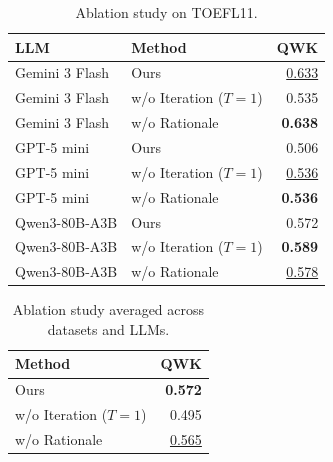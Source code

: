 \begin{table}[t]
\centering
\small
\caption{Ablation study on TOEFL11.}
\begin{tabular}{llr}
\toprule
LLM & Method & QWK \\
\midrule
Gemini 3 Flash & Ours & \underline{0.633} \\
Gemini 3 Flash & w/o Iteration ($T=1$) & 0.535 \\
Gemini 3 Flash & w/o Rationale & \textbf{0.638} \\
\midrule
GPT-5 mini & Ours & 0.506 \\
GPT-5 mini & w/o Iteration ($T=1$) & \underline{0.536} \\
GPT-5 mini & w/o Rationale & \textbf{0.536} \\
\midrule
Qwen3-80B-A3B & Ours & 0.572 \\
Qwen3-80B-A3B & w/o Iteration ($T=1$) & \textbf{0.589} \\
Qwen3-80B-A3B & w/o Rationale & \underline{0.578} \\
\bottomrule
\end{tabular}
\end{table}

\begin{table}[t]
\centering
\small
\caption{Ablation study averaged across datasets and LLMs.}
\begin{tabular}{lr}
\toprule
Method & QWK \\
\midrule
Ours & \textbf{0.572} \\
w/o Iteration ($T=1$) & 0.495 \\
w/o Rationale & \underline{0.565} \\
\bottomrule
\end{tabular}
\end{table}
